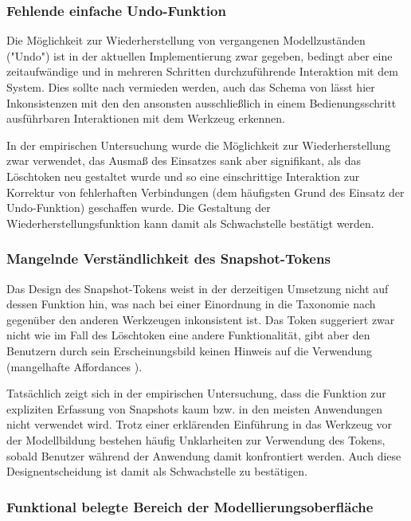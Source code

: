 \subsubsection{Fehlende einfache Undo-Funktion}

Die Möglichkeit zur Wiederherstellung von vergangenen Modellzuständen ("Undo") ist in der aktuellen Implementierung zwar gegeben, bedingt aber eine zeitaufwändige und in mehreren Schritten durchzuführende Interaktion mit dem System. Dies sollte nach \citet{Bellotti02} vermieden werden, auch das Schema von \citet{Shaer04} lässt hier Inkonsistenzen mit den den ansonsten ausschließlich in einem Bedienungsschritt ausführbaren Interaktionen mit dem Werkzeug erkennen.

In der empirischen Untersuchung wurde die Möglichkeit zur Wiederherstellung zwar verwendet, das Ausmaß des Einsatzes sank aber signifikant, als das Löschtoken neu gestaltet wurde und so eine einschrittige Interaktion zur Korrektur von fehlerhaften Verbindungen (dem häufigsten Grund des Einsatz der Undo-Funktion) geschaffen wurde. Die Gestaltung der Wiederherstellungsfunktion kann damit als Schwachstelle bestätigt werden.

\subsubsection{Mangelnde Verständlichkeit des Snapshot-Tokens}

Das Design des Snapshot-Tokens weist in der derzeitigen Umsetzung nicht auf dessen Funktion hin, was nach bei einer Einordnung in die Taxonomie nach \citet{Fishkin04} gegenüber den anderen Werkzeugen inkonsistent ist. Das Token suggeriert zwar nicht wie im Fall des Löschtoken eine andere Funktionalität, gibt aber den Benutzern durch sein Erscheinungsbild keinen Hinweis auf die Verwendung (mangelhafte Affordances \citet{Norman90}).

Tatsächlich zeigt sich in der empirischen Untersuchung, dass die Funktion zur expliziten Erfassung von Snapshots kaum bzw. in den meisten Anwendungen nicht verwendet wird. Trotz einer erklärenden Einführung in das Werkzeug vor der Modellbildung bestehen häufig Unklarheiten zur Verwendung des Tokens, sobald Benutzer während der Anwendung damit konfrontiert werden. Auch diese Designentscheidung ist damit als Schwachstelle zu bestätigen. 

\subsubsection{Funktional belegte Bereich der Modellierungsoberfläche}

